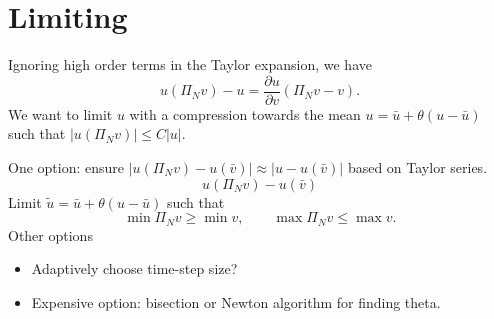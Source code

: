 \documentclass[preprint,10pt]{article}
\theoremstyle{definition}
\theoremstyle{lemma}
\theoremstyle{theorem}
\theoremstyle{assumption}
\newcommand{\pd}[2]{\frac{\partial#1}{\partial#2}}
\newcommand{\LRp}[1]{\left( #1 \right)}
\newcommand{\LRb}[1]{\left| #1 \right|}
\begin{document}
\section{Limiting}

Ignoring high order terms in the Taylor expansion, we have
\[
u\LRp{\Pi_N v} - u = \pd{u}{v} \LRp{\Pi_Nv - v}.
\]
We want to limit $u$ with a compression towards the mean $u = \bar{u} + \theta(u-\bar{u})$ such that $\LRb{u\LRp{\Pi_N v}} \leq C\LRb{u}$.  

One option: ensure $\LRb{u\LRp{\Pi_N v} - u(\bar{v})} \approx \LRb{u - u(\bar{v})}$ based on Taylor series. 
\[
u\LRp{\Pi_N v} - u(\bar{v})
\]
Limit $\tilde{u} = \bar{u} + \theta(u-\bar{u})$ such that 
\[
\min \Pi_N v \geq \min v, \qquad \max \Pi_N v \leq \max v.
\]
Other options
\begin{itemize}
\item Adaptively choose time-step size?
\item Expensive option: bisection or Newton algorithm for finding theta.  
\end{itemize}





\end{document}

